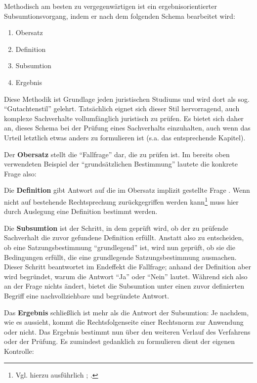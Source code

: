 Methodisch am besten zu vergegenwärtigen ist ein ergebnisorientierter Subsumtionsvorgang, indem er nach dem folgenden Schema bearbeitet wird:
\begin{enumerate}
\item Obersatz
\item Definition
\item Subsumtion
\item Ergebnis
\end{enumerate}

Diese Methodik ist Grundlage jeden juristischen Studiums und wird dort als sog. \enquote{Gutachtenstil} gelehrt.
Tatsächlich eignet sich dieser Stil hervorragend, auch komplexe Sachverhalte vollumfänglich juristisch zu prüfen.
Es bietet sich daher an, dieses Schema bei der Prüfung eines Sachverhalts einzuhalten, auch wenn das Urteil letztlich etwas anders zu formulieren ist (s.a. das entsprechende Kapitel).

Der \textbf{Obersatz} stellt die \enquote{Fallfrage} dar, die zu prüfen ist.
Im bereits oben verwendeten Beispiel der \enquote{grundsätzlichen Bestimmung} lautete die konkrete Frage also:

Die \textbf{Definition} gibt Antwort auf die im Obersatz implizit gestellte Frage .
Wenn nicht auf bestehende Rechtsprechung zurückgegriffen werden kann\footnote{Vgl. hierzu ausführlich \cite[S.~8]{LSGBB135}; \cite[S.~5]{BSG1215HS}.} muss hier durch Auslegung eine Definition bestimmt werden.

Die \textbf{Subsumtion} ist der Schritt, in dem geprüft wird, ob der zu prüfende Sachverhalt die zuvor gefundene Definition erfüllt.
Anstatt also zu entscheiden, ob eine Satzungsbestimmung \enquote{grundlegend} ist, wird nun geprüft, ob sie die Bedingungen erfüllt, die eine grundlegende Satzungsbestimmung ausmachen.
Dieser Schritt beantwortet im Endeffekt die Fallfrage; anhand der Definition aber wird begründet, warum die Antwort \enquote{Ja} oder \enquote{Nein} lautet.
Während sich also an der Frage nichts ändert, bietet die Subsumtion unter einen zuvor definierten Begriff eine nachvollziehbare und begründete Antwort.

Das \textbf{Ergebnis} schließlich ist mehr als die Antwort der Subsumtion:
Je nachdem, wie es aussieht, kommt die Rechtsfolgenseite einer Rechtsnorm zur Anwendung oder nicht.
Das Ergebnis bestimmt nun über den weiteren Verlauf des Verfahrens oder der Prüfung.
Es zumindest gedanklich zu formulieren dient der eigenen Kontrolle: 

